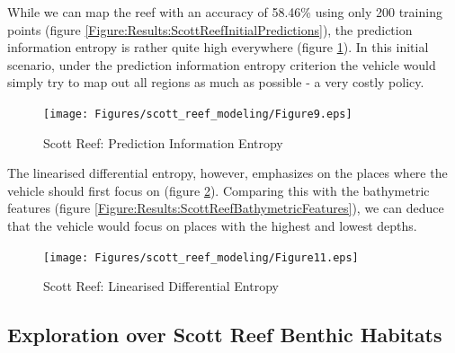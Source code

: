 \documentclass{article}
\begin{document}
		While we can map the reef with an accuracy of 58.46\% using only 200 training points (figure \ref{Figure:Results:ScottReefInitialPredictions}), the prediction information entropy is rather quite high everywhere (figure \ref{Figure:Results:ScottReefPredictionInformationEntropy}). In this initial scenario, under the prediction information entropy criterion the vehicle would simply try to map out all regions as much as possible - a very costly policy.
		
		\begin{figure}[!htbp]
		\centering
			\texttt{[image: Figures/scott\_reef\_modeling/Figure9.eps]}
		\caption{Scott Reef: Prediction Information Entropy}
		\label{Figure:Results:ScottReefPredictionInformationEntropy}
		\end{figure}
					
		The linearised differential entropy, however, emphasizes on the places where the vehicle should first focus on (figure \ref{Figure:Results:ScottReefLinearisedDifferentialEntropy}). Comparing this with the bathymetric features (figure \ref{Figure:Results:ScottReefBathymetricFeatures}), we can deduce that the vehicle would focus on places with the highest and lowest depths.
		
		\begin{figure}[!htbp]
		\centering
			\texttt{[image: Figures/scott\_reef\_modeling/Figure11.eps]}
		\caption{Scott Reef: Linearised Differential Entropy}
		\label{Figure:Results:ScottReefLinearisedDifferentialEntropy}
		\end{figure}
	
			
	\subsection{Exploration over Scott Reef Benthic Habitats}
	
\end{document}
